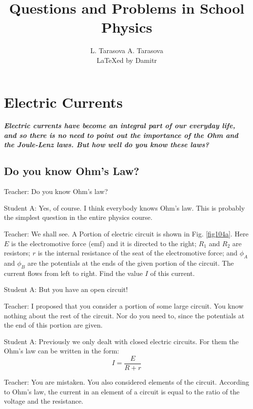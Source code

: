 \documentclass[a4paper,12pt]{book}
\title{Questions and Problems in School Physics}
\date{}
\author{L. Tarasova A. Tarasova \\
\LaTeX ed by Damitr}
\begin{document}
\maketitle





\chapter{Electric Currents}
\paragraph{\it Electric currents have become an integral part of our everyday life, and so there is no need to point out the importance of the Ohm and the Joule-Lenz laws. But how well do you
know these laws? }
\newpage
\section{Do you know Ohm's Law?}

{\sc Teacher:} Do you know Ohm's law?

{\sc Student A:} Yes, of course. I think everybody knows Ohm's law. This is probably the simplest question in the entire physics course.

{\sc Teacher:} We shall see. A Portion of electric circuit is shown in Fig. {\ref{fig104a}}. Here$E$ is the electromotive force (emf) and it is directed to the right; $R_{1}$ and $R_{2}$ are resistors; $r$ is the internal resistance of the seat of the electromotive force; and $\phi_{A}$ and $\phi_{B}$ are the potentials at the ends of the given portion of the circuit. The current flows from left to right. Find the value $I$ of this current. 

{\sc Student A:} But you have an open circuit!

{\sc Teacher:} I proposed that you consider a portion of some large circuit. You know nothing about the rest of the circuit. Nor do you need to, since the potentials at the end of this portion are given.

{\sc Student A:} Previously we only dealt with closed electric circuits. For them the Ohm's law can be written in the form:
\begin{equation}
I = \frac{E}{R + r} \label{164}
\end{equation}


{\sc Teacher:} You are mistaken. You also considered elements of the circuit. According to Ohm's law, the current in an element of a circuit is equal to the ratio of the voltage and the resistance.
\end{document}
